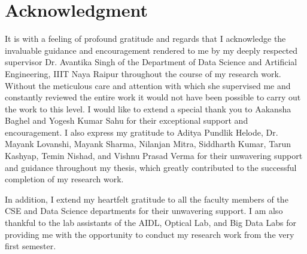 \chapter*{Acknowledgment}

It is with a feeling of profound gratitude and regards that I acknowledge the invaluable guidance and encouragement rendered to me by my deeply respected supervisor Dr. Avantika Singh of the Department of Data Science and Artificial Engineering, IIIT Naya Raipur throughout the course of my research work. Without the meticulous care and attention with which she supervised me and constantly reviewed the entire work it would not have been possible to carry out the work to this level. I would like to extend a special thank you to Aakansha Baghel and Yogesh Kumar Sahu for their exceptional support and encouragement. I also express my gratitude to Aditya Pundlik Helode, Dr. Mayank Lovanshi, Mayank Sharma, Nilanjan Mitra, Siddharth Kumar, Tarun Kashyap, Temin Nishad, and Vishnu Prasad Verma for their unwavering support and guidance throughout my thesis, which greatly contributed to the successful completion of my research work.

In addition, I extend my heartfelt gratitude to all the faculty members of the CSE and Data Science departments for their unwavering support. I am also thankful to the lab assistants of the AIDL, Optical Lab, and Big Data Labs for providing me with the opportunity to conduct my research work from the very first semester. 







 
